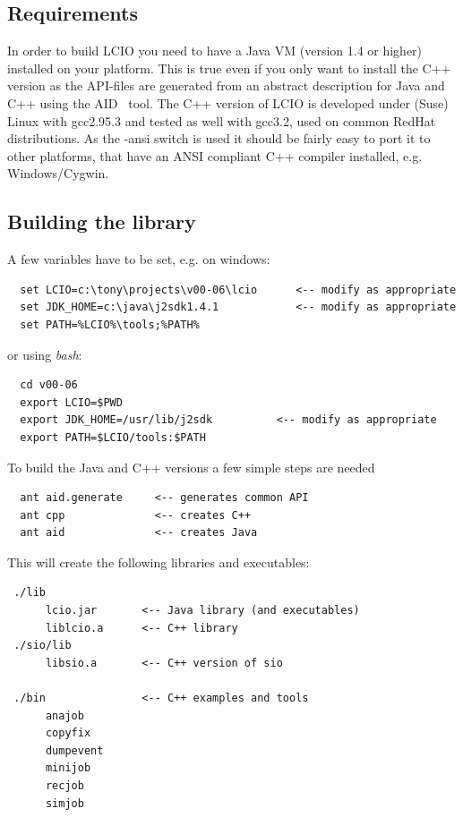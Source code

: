 \documentclass[twoside]{article}
\begin{document}
\subsection{Requirements}
In order to build LCIO you need to have a Java VM (version 1.4 or higher) installed 
on your platform. This is true even if you only want to install the C++ version as the 
API-files are generated from an abstract description for Java and C++ using the 
AID~\cite{ref_aid} tool.
The C++ version of LCIO is developed under (Suse) Linux with gcc2.95.3 and tested
as well with gcc3.2, used on common RedHat distributions. 
As the -ansi switch is used it should be fairly easy to port it to other platforms, that have
an ANSI compliant C++ compiler installed, e.g. Windows/Cygwin.

\subsection {Building the library}
A few variables have to be set, e.g. on windows:
\begin{verbatim}
  set LCIO=c:\tony\projects\v00-06\lcio      <-- modify as appropriate
  set JDK_HOME=c:\java\j2sdk1.4.1            <-- modify as appropriate
  set PATH=%LCIO%\tools;%PATH%
\end{verbatim}
or using {\it bash}:
\begin{verbatim}
  cd v00-06
  export LCIO=$PWD
  export JDK_HOME=/usr/lib/j2sdk          <-- modify as appropriate
  export PATH=$LCIO/tools:$PATH
\end{verbatim}


To build the Java and C++ versions a few simple steps are needed
\begin{verbatim}
  ant aid.generate     <-- generates common API
  ant cpp              <-- creates C++
  ant aid              <-- creates Java  
\end{verbatim}

This will create the following libraries and executables:

\begin{verbatim}
 ./lib
      lcio.jar       <-- Java library (and executables)
      liblcio.a      <-- C++ library
 ./sio/lib
      libsio.a       <-- C++ version of sio 

 ./bin               <-- C++ examples and tools
      anajob
      copyfix
      dumpevent
      minijob
      recjob
      simjob
\end{verbatim}
\end{document}
